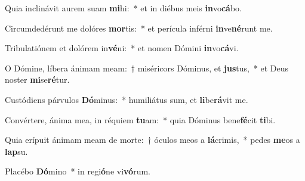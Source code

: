 \item Quia inclinávit aurem suam \textbf{mi}hi:~* et in diébus meis \textbf{in}vo\textbf{cá}bo.
\item Circumdedérunt me dolóres \textbf{mor}tis:~* et perícula inférni \textbf{in}ve\textbf{né}runt me.
\item Tribulatiónem et dolórem in\textbf{vé}ni:~* et nomen Dómini \textbf{in}vo\textbf{cá}vi.
\item O Dómine, líbera ánimam meam:~† miséricors Dóminus, et \textbf{jus}tus,~* et Deus noster \textbf{mi}se\textbf{ré}tur.
\item Custódiens párvulos \textbf{Dó}minus:~* humiliátus sum, et \textbf{li}be\textbf{rá}vit me.
\item Convértere, ánima mea, in réquiem \textbf{tu}am:~* quia Dóminus bene\textbf{fé}cit \textbf{ti}bi.
\item Quia erípuit ánimam meam de morte:~† óculos meos a \textbf{lá}crimis,~* pedes \textbf{me}os a \textbf{lap}su.
\item Placébo \textbf{Dó}mino~* in regi\textbf{ó}ne vi\textbf{vó}rum.

